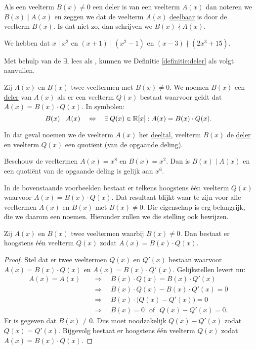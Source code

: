 \documentclass{ximera}
\begin{document}
Als een veelterm $B(x) \neq 0$ een deler is van een veelterm $A(x)$ dan noteren we $B(x) \mid A(x)$ en zeggen we dat de veelterm $A(x)$ \underline{deelbaar} is door de veelterm $B(x)$. Is dat niet zo, dan schrijven we $B(x) \nmid A(x)$. 

\begin{example} 
We hebben dat $x \mid x^2$ en $(x+1) \mid (x^2-1)$ en $(x-3) \nmid (2x^3+15)$.
\end{example}

Met behulp van de  $\exists$, lees als , kunnen we Definitie \ref{definitie:deler} als volgt aanvullen.

\begin{definition}
Zij $A(x)$ en $B(x)$ twee veeltermen met $B(x) \neq 0$. We noemen $B(x)$ een \underline{deler} van $A(x)$ als er een veelterm $Q(x)$ bestaat waarvoor geldt dat $A(x) = B(x)\cdot Q(x)$. In symbolen:
\[
B(x) \mid A(x) \quad \Leftrightarrow \quad \exists \, Q(x) \in \mathbb{R}[x]: A(x) = B(x)\cdot Q(x).
\]
\end{definition}

In dat geval noemen we de veelterm $A(x)$ het \underline{deeltal}, veelterm $B(x)$ de \underline{deler} en veelterm $Q(x)$ een \underline{quoti\"ent (van de opgaande deling)}. 

\begin{example}
Beschouw de veeltermen $A(x) = x^8$ en $B(x) = x^2$. Dan is $B(x) \mid A(x)$ en een quoti\"ent van de opgaande deling is gelijk aan $x^6$. 
\end{example}

In de bovenstaande voorbeelden bestaat er telkens hoogstens \'e\'en veelterm $Q(x)$ waarvoor $A(x) = B(x)\cdot Q(x)$. Dat resultaat blijkt waar te zijn voor alle veeltermen $A(x)$ en $B(x)$ met $B(x) \neq 0$. Die eigenschap is erg belangrijk, die we daarom een  noemen. Hieronder zullen we die stelling ook bewijzen. 

\begin{stelling}
Zij $A(x)$ en $B(x)$ twee veeltermen waarbij $B(x) \neq 0$. Dan bestaat er hoogstens \'e\'en veelterm $Q(x)$ zodat $A(x) = B(x)\cdot Q(x)$. 
\end{stelling}
\begin{proof}
Stel dat er twee veeltermen $Q(x)$ en $Q'(x)$ bestaan waarvoor $A(x) = B(x)\cdot Q(x)$ en $A(x) = B(x)\cdot Q'(x)$. Gelijkstellen levert nu:
\begin{align*}
A(x) = A(x) \quad & \Rightarrow \quad B(x)\cdot Q(x) = B(x)\cdot Q'(x) \\
& \Rightarrow \quad B(x)\cdot Q(x) - B(x)\cdot Q'(x) = 0 \\
& \Rightarrow \quad B(x) \cdot \bigl(Q(x) - Q'(x) \bigr) = 0 \\
& \Rightarrow \quad B(x) = 0 \,\,\text{ of } \,\, Q(x) - Q'(x) = 0. 
\end{align*}
Er is gegeven dat $B(x) \neq 0$. Dus moet noodzakelijk $Q(x) - Q'(x)$ zodat $Q(x) = Q'(x)$. Bijgevolg bestaat er hoogstens \'e\'en veelterm $Q(x)$ zodat $A(x) = B(x)\cdot Q(x)$.
\end{proof}
\end{document}
